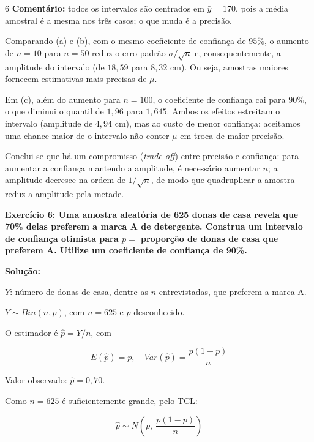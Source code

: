\documentclass[8pt, a4paper, landscape]{extarticle}
\begin{document}
\begin{multicols}{6}
\textbf{Comentário:} todos os intervalos são centrados em $\bar{y} = 170$, pois a média amostral é a mesma nos três casos; o que muda é a precisão.

Comparando (a) e (b), com o mesmo coeficiente de confiança de $95\%$, o aumento de $n = 10$ para $n = 50$ reduz o erro padrão $\sigma/\sqrt{n}$ e, consequentemente, a amplitude do intervalo (de $18,59$ para $8,32$ cm). Ou seja, amostras maiores fornecem estimativas mais precisas de $\mu$.

Em (c), além do aumento para $n = 100$, o coeficiente de confiança cai para $90\%$, o que diminui o quantil de $1,96$ para $1,645$. Ambos os efeitos estreitam o intervalo (amplitude de $4,94$ cm), mas ao custo de menor confiança: aceitamos uma chance maior de o intervalo não conter $\mu$ em troca de maior precisão.

Conclui-se que há um compromisso (\textit{trade-off}) entre precisão e confiança: para aumentar a confiança mantendo a amplitude, é necessário aumentar $n$; a amplitude decresce na ordem de $1/\sqrt{n}$, de modo que quadruplicar a amostra reduz a amplitude pela metade.

\textbf{Exercício 6: Uma amostra aleatória de 625 donas de casa revela que 70\% delas preferem a marca A de detergente. Construa um intervalo de confiança otimista para $p =$ proporção de donas de casa que preferem A. Utilize um coeficiente de confiança de 90\%.}

\vspace{0.3cm}

\textbf{Solução:}

$Y$: número de donas de casa, dentre as $n$ entrevistadas, que preferem a marca A.

$Y \sim Bin(n, p)$, com $n = 625$ e $p$ desconhecido.

O estimador é $\hat{p} = Y/n$, com

\begin{equation*}
E(\hat{p}) = p, \quad Var(\hat{p}) = \frac{p(1-p)}{n}
\end{equation*}

Valor observado: $\hat{p} = 0,70$.

Como $n = 625$ é suficientemente grande, pelo TCL:

\begin{equation*}
\hat{p} \sim N\left(p,\ \frac{p(1-p)}{n}\right)
\end{equation*}


\end{multicols}
\end{document}
